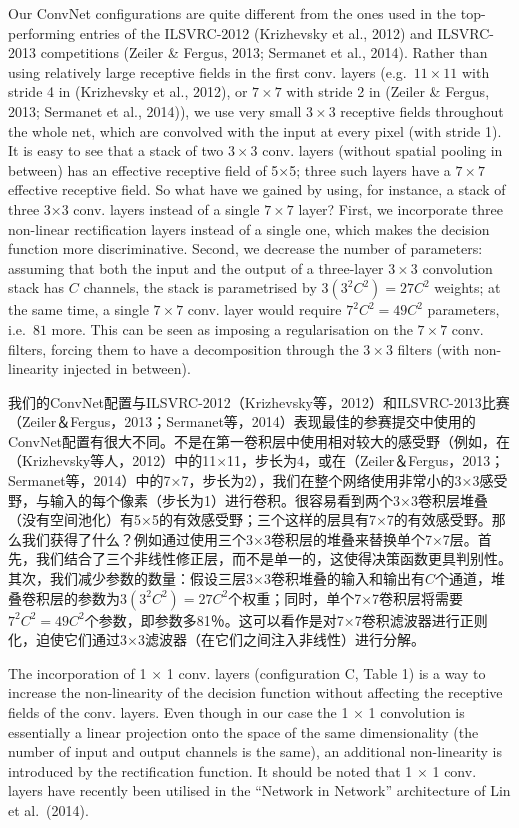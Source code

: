 \documentclass[12pt,a4paper,UTF8,twoside]{book}
\begin{document}
Our ConvNet configurations are quite different from the ones used in the top-performing entries of the ILSVRC-2012 (Krizhevsky et al., 2012) and ILSVRC-2013 competitions (Zeiler \& Fergus, 2013; Sermanet et al., 2014). Rather than using relatively large receptive fields in the first conv. layers (e.g.~\(11×11\) with stride 4 in (Krizhevsky et al., 2012), or \(7×7\) with stride 2 in (Zeiler \& Fergus, 2013; Sermanet et al., 2014)), we use very small \(3 × 3\) receptive fields throughout the whole net, which are convolved with the input at every pixel (with stride 1). It is easy to see that a stack of two \(3×3\) conv. layers (without spatial pooling in between) has an effective receptive field of 5×5; three such layers have a \(7 × 7\) effective receptive field. So what have we gained by using, for instance, a stack of three 3×3 conv. layers instead of a single \(7×7\) layer? First, we incorporate three non-linear rectification layers instead of a single one, which makes the decision function more discriminative. Second, we decrease the number of parameters: assuming that both the input and the output of a three-layer \(3 × 3\) convolution stack has \(C\) channels, the stack is parametrised by \(3(3^2C^2) = 27C^2\) weights; at the same time, a single \(7 × 7\) conv. layer would require \(7^2C^2 = 49C^2\) parameters, i.e.~\(81%
\) more. This can be seen as imposing a regularisation on the \(7 × 7\) conv. filters, forcing them to have a decomposition through the \(3 × 3\) filters (with non-linearity injected in between).

我们的ConvNet配置与ILSVRC-2012（Krizhevsky等，2012）和ILSVRC-2013比赛（Zeiler＆Fergus，2013；Sermanet等，2014）表现最佳的参赛提交中使用的ConvNet配置有很大不同。不是在第一卷积层中使用相对较大的感受野（例如，在（Krizhevsky等人，2012）中的11×11，步长为4，或在（Zeiler＆Fergus，2013；Sermanet等，2014）中的7×7，步长为2），我们在整个网络使用非常小的3×3感受野，与输入的每个像素（步长为1）进行卷积。很容易看到两个3×3卷积层堆叠（没有空间池化）有5×5的有效感受野；三个这样的层具有7×7的有效感受野。那么我们获得了什么？例如通过使用三个3×3卷积层的堆叠来替换单个7×7层。首先，我们结合了三个非线性修正层，而不是单一的，这使得决策函数更具判别性。其次，我们减少参数的数量：假设三层3×3卷积堆叠的输入和输出有\(C\)个通道，堆叠卷积层的参数为\(3(3^2C^2) = 27C^2\)个权重；同时，单个7×7卷积层将需要\(7^2C^2 = 49C^2\)个参数，即参数多81％。这可以看作是对7×7卷积滤波器进行正则化，迫使它们通过3×3滤波器（在它们之间注入非线性）进行分解。

The incorporation of 1 × 1 conv. layers (configuration C, Table 1) is a way to increase the non-linearity of the decision function without affecting the receptive fields of the conv. layers. Even though in our case the 1 × 1 convolution is essentially a linear projection onto the space of the same dimensionality (the number of input and output channels is the same), an additional non-linearity is introduced by the rectification function. It should be noted that 1 × 1 conv. layers have recently been utilised in the ``Network in Network'' architecture of Lin et al.~(2014).
\end{document}
